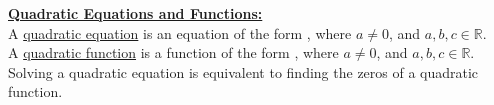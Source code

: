 \noindent \underline{\textbf{Quadratic Equations and Functions:}} \\[0.15in]
A \underline{quadratic equation} is an equation of the form \lgblank, where $a\ne 0$, and $a, b, c \in \mathbb{R}$. \\[.15in]
A \underline{quadratic function} is a function of the form \lgblank, where $a\ne 0$, and $a, b, c \in \mathbb{R}$. \\[.15in]
Solving a quadratic equation is equivalent to finding the zeros of a quadratic function. \\[.15in]

